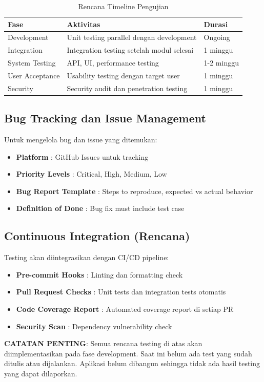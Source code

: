 \begin{table}[htbp]
\centering
\caption{Rencana Timeline Pengujian}
\label{tab:testing_timeline}
\begin{tabularx}{\textwidth}{|l|X|l|}
\hline
\textbf{Fase} & \textbf{Aktivitas} & \textbf{Durasi} \\
\hline
Development & Unit testing parallel dengan development & Ongoing \\
\hline
Integration & Integration testing setelah modul selesai & 1 minggu \\
\hline
System Testing & API, UI, performance testing & 1-2 minggu \\
\hline
User Acceptance & Usability testing dengan target user & 1 minggu \\
\hline
Security & Security audit dan penetration testing & 1 minggu \\
\hline
\end{tabularx}
\end{table}

\subsection{Bug Tracking dan Issue Management}

Untuk mengelola bug dan issue yang ditemukan:

\begin{itemize}[leftmargin=*]
    \item \textbf{Platform} : GitHub Issues untuk tracking
    \item \textbf{Priority Levels} : Critical, High, Medium, Low
    \item \textbf{Bug Report Template} : Steps to reproduce, expected vs actual behavior
    \item \textbf{Definition of Done} : Bug fix must include test case
\end{itemize}

\subsection{Continuous Integration (Rencana)}

Testing akan diintegrasikan dengan CI/CD pipeline:

\begin{itemize}[leftmargin=*]
    \item \textbf{Pre-commit Hooks} : Linting dan formatting check
    \item \textbf{Pull Request Checks} : Unit tests dan integration tests otomatis
    \item \textbf{Code Coverage Report} : Automated coverage report di setiap PR
    \item \textbf{Security Scan} : Dependency vulnerability check
\end{itemize}

\textbf{CATATAN PENTING}: Semua rencana testing di atas akan diimplementasikan pada fase development. Saat ini belum ada test yang sudah ditulis atau dijalankan. Aplikasi belum dibangun sehingga tidak ada hasil testing yang dapat dilaporkan.
